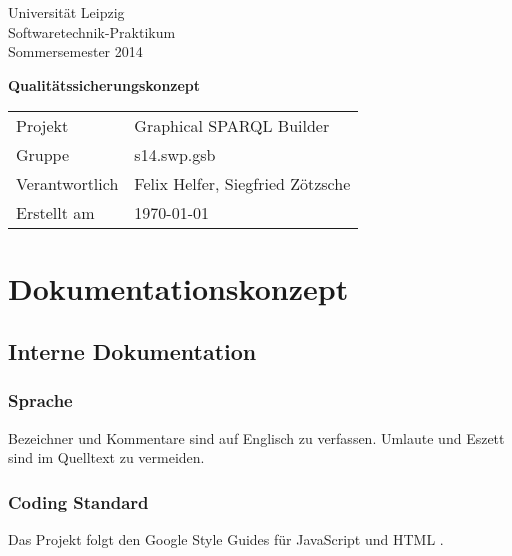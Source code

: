 
\def\verantwortlicher{Felix Helfer, Siegfried Zötzsche} %
\thispagestyle{empty} 

\vspace*{2\baselineskip}

\begin{center}
\sffamily
Universität Leipzig\\
Softwaretechnik-Praktikum\\
Sommersemester 2014
\baselineskip

\bgroup
\Huge\textbf{Qualitätssicherungskonzept}
\egroup
{}\baselineskip

\begin{tabular}{ll}
Projekt & Graphical SPARQL Builder \\
Gruppe & s14.swp.gsb \\
Verantwortlich & \verantwortlicher\\
Erstellt am & \today \\
\end{tabular}
\end{center}

\vfill%

\tableofcontents

\pagebreak

\section{Dokumentationskonzept}

\subsection{Interne Dokumentation}

\subsubsection{Sprache}

Bezeichner und Kommentare sind auf Englisch zu verfassen.
Umlaute und Eszett sind im Quelltext zu vermeiden.

\subsubsection{Coding Standard}

Das Projekt folgt den Google Style Guides für JavaScript \cite{jsstyleguide}
und HTML \cite{htmlstyleguide}.

